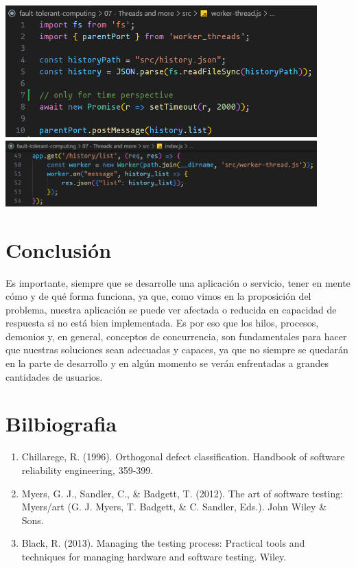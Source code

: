 \documentclass{dense_template}
\begin{document}
 \begin{center}
    \includegraphics[width=0.9\textwidth]{thread-process.png}
    \vspace{1cm}
    \includegraphics[width=0.9\textwidth]{route.png}
 \end{center}
\pagebreak
\section{Conclusión}
Es importante, siempre que se desarrolle una aplicación o servicio, tener en mente cómo y de qué forma funciona, ya que, como vimos en la proposición del problema, nuestra aplicación se puede ver afectada o reducida en capacidad de respuesta si no está bien implementada. Es por eso que los hilos, procesos, demonios y, en general, conceptos de concurrencia, son fundamentales para hacer que nuestras soluciones sean adecuadas y capaces, ya que no siempre se quedarán en la parte de desarrollo y en algún momento se verán enfrentadas a grandes cantidades de usuarios.  
\pagebreak
\section{Bilbiografia}
\sloppy
\begin{enumerate}
    \item Chillarege, R. (1996). Orthogonal defect classification. Handbook of software reliability engineering, 359-399.
    \item Myers, G. J., Sandler, C., \& Badgett, T. (2012). The art of software testing: Myers/art (G. J. Myers, T. Badgett, \& C. Sandler, Eds.). John Wiley \& Sons.
    \item Black, R. (2013). Managing the testing process: Practical tools and techniques for managing hardware and software testing. Wiley.
\end{enumerate}
\end{document}
